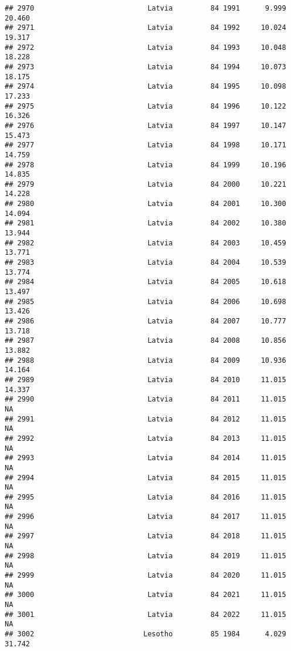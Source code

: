 \documentclass[
]{article}
\begin{document}
\begin{verbatim}
## 2970                           Latvia         84 1991      9.999     20.460
## 2971                           Latvia         84 1992     10.024     19.317
## 2972                           Latvia         84 1993     10.048     18.228
## 2973                           Latvia         84 1994     10.073     18.175
## 2974                           Latvia         84 1995     10.098     17.233
## 2975                           Latvia         84 1996     10.122     16.326
## 2976                           Latvia         84 1997     10.147     15.473
## 2977                           Latvia         84 1998     10.171     14.759
## 2978                           Latvia         84 1999     10.196     14.835
## 2979                           Latvia         84 2000     10.221     14.228
## 2980                           Latvia         84 2001     10.300     14.094
## 2981                           Latvia         84 2002     10.380     13.944
## 2982                           Latvia         84 2003     10.459     13.771
## 2983                           Latvia         84 2004     10.539     13.774
## 2984                           Latvia         84 2005     10.618     13.497
## 2985                           Latvia         84 2006     10.698     13.426
## 2986                           Latvia         84 2007     10.777     13.718
## 2987                           Latvia         84 2008     10.856     13.882
## 2988                           Latvia         84 2009     10.936     14.164
## 2989                           Latvia         84 2010     11.015     14.337
## 2990                           Latvia         84 2011     11.015         NA
## 2991                           Latvia         84 2012     11.015         NA
## 2992                           Latvia         84 2013     11.015         NA
## 2993                           Latvia         84 2014     11.015         NA
## 2994                           Latvia         84 2015     11.015         NA
## 2995                           Latvia         84 2016     11.015         NA
## 2996                           Latvia         84 2017     11.015         NA
## 2997                           Latvia         84 2018     11.015         NA
## 2998                           Latvia         84 2019     11.015         NA
## 2999                           Latvia         84 2020     11.015         NA
## 3000                           Latvia         84 2021     11.015         NA
## 3001                           Latvia         84 2022     11.015         NA
## 3002                          Lesotho         85 1984      4.029     31.742

\end{verbatim}
\end{document}
